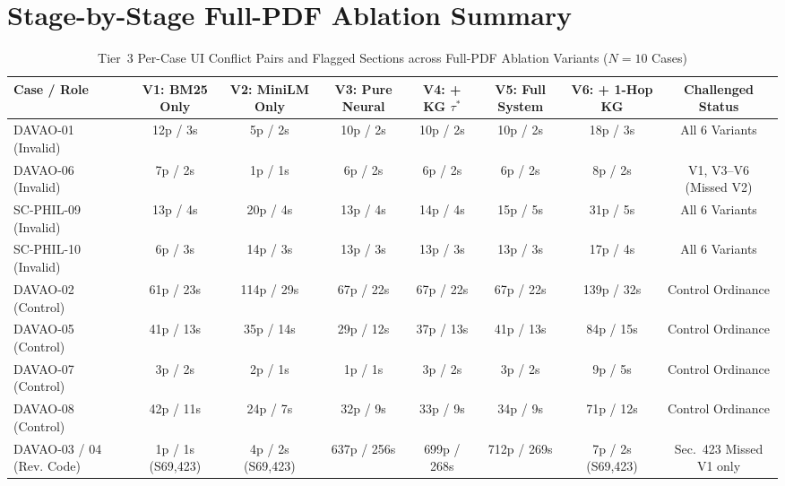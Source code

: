 \section{Stage-by-Stage Full-PDF Ablation Summary}
\label{sec:app_tier3_ablation_summary}

\begin{landscape}
\begin{table}[p]
    \centering
    \scriptsize
    \setlength{\tabcolsep}{3.0pt}
    \renewcommand{\arraystretch}{0.90}
    \caption[Tier 3 Per-Case Stage-by-Stage Ablation Matrix]{Tier~3 Per-Case UI Conflict Pairs and Flagged Sections across Full-PDF Ablation Variants ($N = 10$ Cases)}
    \label{tab:app_tier3_ablation_full}
    \begin{tabular*}{\linewidth}{@{}l@{\extracolsep{\fill}}ccccccc@{}}
        \toprule
        \textbf{Case / Role} & \textbf{V1: BM25 Only} & \textbf{V2: MiniLM Only} & \textbf{V3: Pure Neural} & \textbf{V4: + KG $\tau^*$} & \textbf{V5: Full System} & \textbf{V6: + 1-Hop KG} & \textbf{Challenged Status} \\
        \midrule
        DAVAO-01 (Invalid) & 12p / 3s & 5p / 2s & 10p / 2s & 10p / 2s & 10p / 2s & 18p / 3s & All 6 Variants \\
        DAVAO-06 (Invalid) & 7p / 2s & 1p / 1s & 6p / 2s & 6p / 2s & 6p / 2s & 8p / 2s & V1, V3--V6 (Missed V2) \\
        SC-PHIL-09 (Invalid) & 13p / 4s & 20p / 4s & 13p / 4s & 14p / 4s & 15p / 5s & 31p / 5s & All 6 Variants \\
        SC-PHIL-10 (Invalid) & 6p / 3s & 14p / 3s & 13p / 3s & 13p / 3s & 13p / 3s & 17p / 4s & All 6 Variants \\
        DAVAO-02 (Control) & 61p / 23s & 114p / 29s & 67p / 22s & 67p / 22s & 67p / 22s & 139p / 32s & Control Ordinance \\
        DAVAO-05 (Control) & 41p / 13s & 35p / 14s & 29p / 12s & 37p / 13s & 41p / 13s & 84p / 15s & Control Ordinance \\
        DAVAO-07 (Control) & 3p / 2s & 2p / 1s & 1p / 1s & 3p / 2s & 3p / 2s & 9p / 5s & Control Ordinance \\
        DAVAO-08 (Control) & 42p / 11s & 24p / 7s & 32p / 9s & 33p / 9s & 34p / 9s & 71p / 12s & Control Ordinance \\
        DAVAO-03 / 04 (Rev. Code) & 1p / 1s (S69,423) & 4p / 2s (S69,423) & 637p / 256s & 699p / 268s & 712p / 269s & 7p / 2s (S69,423) & Sec.~423 Missed V1 only \\
        \bottomrule
    \end{tabular*}
\end{table}


\end{landscape}
